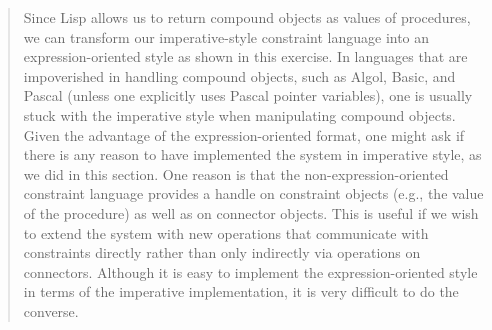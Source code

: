 \begin{quote}
{\noindent
Since Lisp allows us to return compound objects as values of procedures, we can
transform our imperative-style constraint language into an expression-oriented
style as shown in this exercise.  In languages that are impoverished in
handling compound objects, such as Algol, Basic, and Pascal (unless one
explicitly uses Pascal pointer variables), one is usually stuck with the
imperative style when manipulating compound objects.  Given the advantage of
the expression-oriented format, one might ask if there is any reason to have
implemented the system in imperative style, as we did in this section.  One
reason is that the non-expression-oriented constraint language provides a
handle on constraint objects (e.g., the value of the  procedure) as
well as on connector objects.  This is useful if we wish to extend the system
with new operations that communicate with constraints directly rather than only
indirectly via operations on connectors.  Although it is easy to implement the
expression-oriented style in terms of the imperative implementation, it is very
difficult to do the converse.}
\end{quote}
